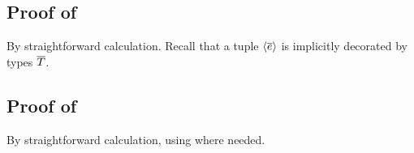\begin{derivation}
\step{\theoO{\eq{\expr}{\true}}}{\hyp}
\end{derivation}



\subsection*{Proof of }

By straightforward calculation. Recall that a tuple $\langle\overline{e}\rangle$ is
implicitly decorated by types $\overline{T}$.



\subsection*{Proof of }

By straightforward calculation, using  where needed.







